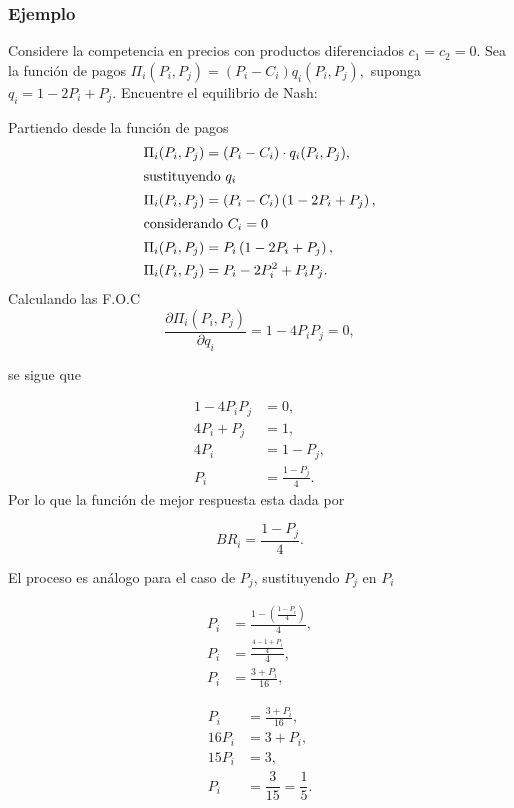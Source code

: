 \documentclass[letterpaper,12pt,twocolumn]{report}
\begin{document}
\subsubsection*{Ejemplo}
Considere la competencia en precios con productos diferenciados $c_1=c_2=0$.
Sea la función de pagos $\Pi_i(P_i,P_j)=(P_i-C_i)q_i(P_i,P_j),$ suponga $q_i=1-2P_i+P_j$. Encuentre el equilibrio de Nash:


Partiendo desde la función de pagos
\begin{align*}
	\Pi_i(P_i,P_j) &=(P_i-C_i)\cdot q_i(P_i,P_j),\\
	\shortintertext{sustituyendo $q_i$}
	\Pi_i(P_i,P_j) &=(P_i-C_i) \left( 1-2P_i+P_j\right),\\
		\shortintertext{considerando $C_i=0$}
	\Pi_i(P_i,P_j) &= P_i \left( 1-2P_i+P_j\right) ,\\
	\Pi_i(P_i,P_j) &= P_i-2P_i^2+P_iP_j.
\end{align*}
\vspace{.75cm}
Calculando las F.O.C
\begin{equation*}
	\dfrac{\partial \Pi_i(P_i,P_j)}{\partial q_i} = 
	1-4P_iP_j=0,
\end{equation*}

se sigue que

\begin{align*}
1-4P_iP_j&=0, \\
4P_i+P_j&=1, \\
4P_i&=1-P_j,\\
P_i&=\frac{1-P_j}{4}.
\end{align*}
Por lo que la función de mejor respuesta esta dada por 

$$ BR_i= \frac{1-P_j}{4}.$$


El proceso es análogo para el caso de $P_j$, sustituyendo $P_j$ en $P_i$

\begin{align*}
	P_i&=\frac{1-\left( \frac{1-P_i}{4} \right) }{4},\\
	P_i&=\frac{\frac{4-1+P_i}{4} }{4},\\
	P_i&=\frac{3+P_i}{16},
\end{align*}


\begin{align*}
	P_i&=\frac{3+P_i}{16},\\
	16P_i&=3+P_i,\\
	15P_i&=3,\\
	P_i &= \dfrac{3}{15}=\dfrac{1}{5}.
\end{align*}
\end{document}
